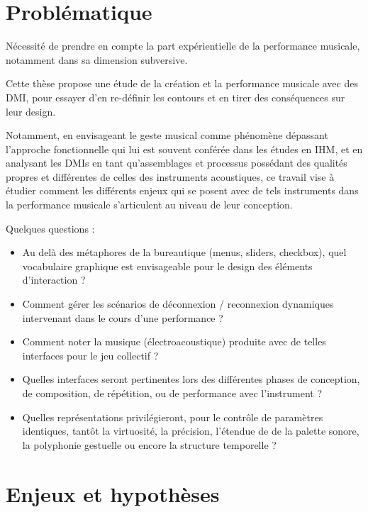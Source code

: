 \section{Problématique}


Nécessité de prendre en compte la part expérientielle de la performance musicale, notamment dans sa dimension subversive.

Cette thèse propose une étude de la création et la performance musicale avec des \gls{DMI}, pour essayer d'en re-définir les contours et en tirer des conséquences sur leur design.

Notamment, en envisageant le geste musical comme phénomène dépassant l'approche fonctionnelle qui lui est souvent conférée dans les études en \gls{IHM}, et en analysant les \glspl{DMI} en tant qu'assemblages et processus possédant des qualités propres et différentes de celles des instruments acoustiques, ce travail vise à étudier comment les différents enjeux qui se posent avec de tels instruments dans la performance musicale s'articulent au niveau de leur conception.

Quelques questions : 
\vspace{-1em}
\begin{itemize}[noitemsep]
\item Au delà des métaphores de la bureautique (menus, sliders, checkbox), quel vocabulaire graphique est envisageable pour le design des éléments d'interaction ?
\item Comment gérer les scénarios de déconnexion / reconnexion dynamiques intervenant dans le cours d'une performance ?
\item Comment noter la musique (électroacoustique) produite avec de telles interfaces pour le jeu collectif ?
\item Quelles interfaces seront pertinentes lors des différentes phases de conception, de composition, de répétition, ou de performance avec l'instrument ?
\item  Quelles représentations privilégieront, pour le contrôle de paramètres identiques, tantôt la virtuosité, la précision, l'étendue de de la palette sonore, la polyphonie gestuelle ou encore la structure temporelle ?
\end{itemize}

\section{Enjeux et hypothèses}

